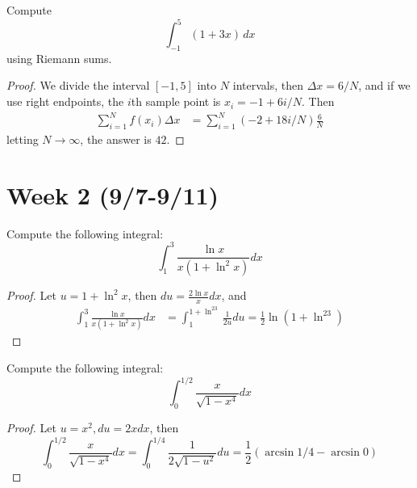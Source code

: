 \documentclass[openany]{book}
\begin{document}
\begin{prob}
    Compute
    \[
    \int_{-1}^{5} (1+3x)\,dx
    \]
    using Riemann sums.
\end{prob}
\begin{proof}
    We divide the interval $[-1, 5]$ into $N$ intervals, then $\Delta x=6/N$, and if we use right endpoints, the $i$th sample point is $x_i=-1+6i/N$. Then 
    \begin{align*}
        \sum_{i=1}^Nf(x_i)\Delta x&=\sum_{i=1}^N(-2+18i/N)\frac{6}{N}
    \end{align*}
    letting $N\to\infty$, the answer is $42$.
\end{proof}







\newpage
\section*{\centering Week 2 (9/7-9/11)}
\begin{prob}
    Compute the following integral:
    \begin{equation*}
        \int_1^3\frac{\ln x}{x(1+\ln^2x)}dx
    \end{equation*}
\end{prob}
\begin{proof}
    Let $u=1+\ln^2 x$, then $du=\frac{2\ln x}{x}dx$, and 
    \begin{align*}
        \int_1^3\frac{\ln x}{x(1+\ln^2x)}dx&=\int_{1}^{1+\ln^23}\frac{1}{2u}du=\frac{1}{2}\ln(1+\ln^23)
    \end{align*}
\end{proof}


\begin{prob}
    Compute the following integral:
    \begin{equation*}
        \int_0^{1/2}\frac{x}{\sqrt{1-x^4}}dx
    \end{equation*}
\end{prob}
\begin{proof}
    Let $u=x^2, du=2xdx$, then 
    \begin{equation*}
        \int_0^{1/2}\frac{x}{\sqrt{1-x^4}}dx=\int_0^{1/4}\frac{1}{2\sqrt{1-u^2}}du=\frac{1}{2}\left(\arcsin 1/4-\arcsin 0\right)
    \end{equation*}
\end{proof}
\end{document}
